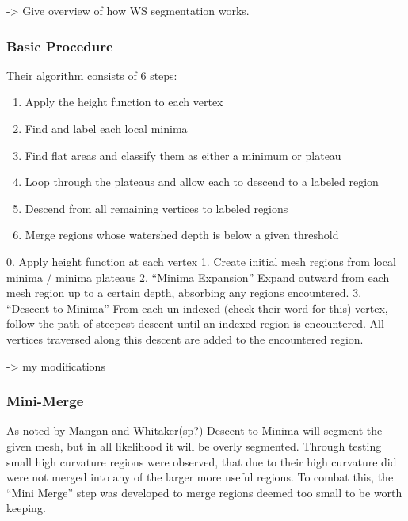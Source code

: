 -> Give overview of how WS segmentation works.
\subsubsection{Basic Procedure}
Their algorithm consists of 6 steps:
\begin{enumerate}
	\item Apply the height function to each vertex
	\item Find and label each local minima
	\item Find flat areas and classify them as either a minimum or plateau
	\item Loop through the plateaus and allow each to descend to a labeled region
	\item Descend from all remaining vertices to labeled regions
	\item Merge regions whose watershed depth is below a given threshold
\end{enumerate}

0. Apply height function at each vertex
1. Create initial mesh regions from local minima / minima plateaus
2. ``Minima Expansion'' Expand outward from each mesh region up to a certain depth, absorbing any regions encountered.
3. ``Descent to Minima'' From each un-indexed (check their word for this) vertex, follow the path of steepest descent until an indexed region is encountered.
All vertices traversed along this descent are added to the encountered region.

-> my modifications
\subsubsection{Mini-Merge}
As noted by Mangan and Whitaker(sp?) Descent to Minima will segment the given mesh, but in all likelihood it will be overly segmented.
Through testing small high curvature regions were observed, that due to their high curvature did were not merged into any of the larger more useful regions.
To combat this, the ``Mini Merge'' step was developed to merge regions deemed too small to be worth keeping.

